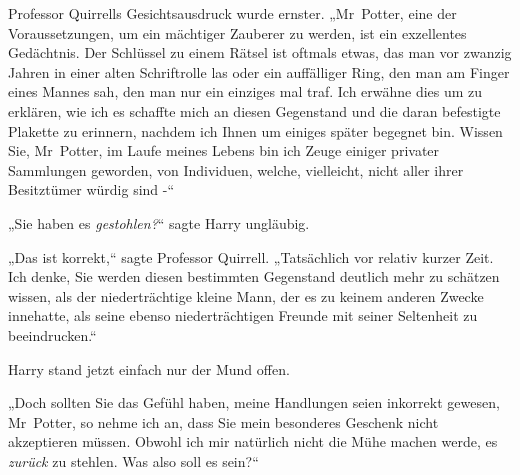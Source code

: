 Professor Quirrells Gesichtsausdruck wurde ernster. „Mr~Potter, eine der Voraussetzungen, um ein mächtiger Zauberer zu werden, ist ein exzellentes Gedächtnis. Der Schlüssel zu einem Rätsel ist oftmals etwas, das man vor zwanzig Jahren in einer alten Schriftrolle las oder ein auffälliger Ring, den man am Finger eines Mannes sah, den man nur ein einziges mal traf. Ich erwähne dies um zu erklären, wie ich es schaffte mich an diesen Gegenstand und die daran befestigte Plakette zu erinnern, nachdem ich Ihnen um einiges später begegnet bin. Wissen Sie, Mr~Potter, im Laufe meines Lebens bin ich Zeuge einiger privater Sammlungen geworden, von Individuen, welche, vielleicht, nicht aller ihrer Besitztümer würdig sind -“

„Sie haben es \emph{gestohlen?}“ sagte Harry ungläubig.

„Das ist korrekt,“ sagte Professor Quirrell. „Tatsächlich vor relativ kurzer Zeit. Ich denke, Sie werden diesen bestimmten Gegenstand deutlich mehr zu schätzen wissen, als der niederträchtige kleine Mann, der es zu keinem anderen Zwecke innehatte, als seine ebenso niederträchtigen Freunde mit seiner Seltenheit zu beeindrucken.“

Harry stand jetzt einfach nur der Mund offen.

„Doch sollten Sie das Gefühl haben, meine Handlungen seien inkorrekt gewesen, Mr~Potter, so nehme ich an, dass Sie mein besonderes Geschenk nicht akzeptieren müssen. Obwohl ich mir natürlich nicht die Mühe machen werde, es \emph{zurück} zu stehlen. Was also soll es sein?“

